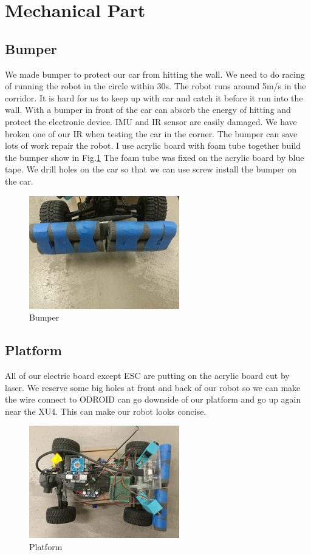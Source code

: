 \documentclass[a4paper, 10pt, conference]{ieeeconf}      %
\begin{document}
\section{Mechanical Part}

\subsection{Bumper}
We made bumper to protect our car from hitting the wall. We need to do racing of running the robot in the circle within 30s. The robot runs around 5m/s in the corridor. It is hard for us to keep up with car and catch it before it run into the wall. With a bumper in front of the car can absorb the energy of hitting and protect the electronic device. IMU and IR sensor are easily damaged. We have broken one of our IR when testing the car in the corner. The bumper can save lots of work repair the robot. I use acrylic board with foam tube together build the bumper show in Fig.\ref{bumper} The foam tube was fixed on the acrylic board by blue tape. We drill holes on the car so that we can use screw install the bumper on the car.
\begin{figure}[htp]
    \centering
    \includegraphics{bumper.png}
    \caption{Bumper}
    \label{bumper}
\end{figure}

\subsection{Platform}
All of our electric board except ESC are putting on the acrylic board cut by laser. We reserve some big holes at front and back of our robot so we can make the wire connect to ODROID can go downside of our platform and go up again near the XU4. This can make our robot looks concise.
\begin{figure}[htp]
    \centering
    \includegraphics{platform.png}
    \caption{Platform}
    \label{platform}
\end{figure}
\end{document}
